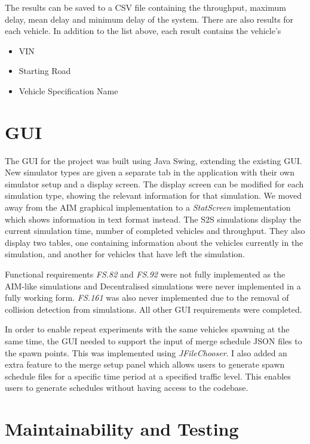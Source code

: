 The results can be saved to a CSV file containing the throughput, maximum delay, mean delay and minimum delay of the system. There are also results for each vehicle. In addition to the list above, each result contains the vehicle's

\begin{itemize}
\item VIN
\item Starting Road
\item Vehicle Specification Name
\end{itemize}

\section{GUI}
\label{sec:GUI}
The GUI for the project was built using Java Swing, extending the existing GUI. New simulator types are given a separate tab in the application with their own simulator setup and a display screen. The display screen can be modified for each simulation type, showing the relevant information for that simulation. We moved away from the AIM graphical implementation to a \emph{StatScreen} implementation which shows information in text format instead. The S2S simulations display the current simulation time, number of completed vehicles and throughput. They also display two tables, one containing information about the vehicles currently in the simulation, and another for vehicles that have left the simulation.

Functional requirements \emph{FS.82} and \emph{FS.92} were not fully implemented as the AIM-like simulations and Decentralised simulations were never implemented in a fully working form. \emph{FS.161} was also never implemented due to the removal of collision detection from simulations. All other GUI requirements were completed.

In order to enable repeat experiments with the same vehicles spawning at the same time, the GUI needed to support the input of merge schedule JSON files to the spawn points. This was implemented using \emph{JFileChooser}. I also added an extra feature to the merge setup panel which allows users to generate spawn schedule files for a specific time period at a specified traffic level. This enables users to generate schedules without having access to the codebase.

\section{Maintainability and Testing}
\label{sec:Testing}

